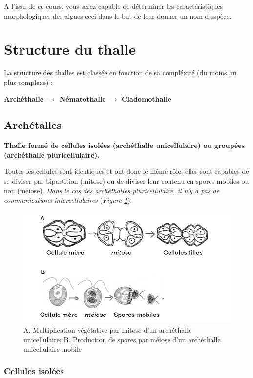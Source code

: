 \documentclass[
]{book}
\begin{document}
A l'issu de ce cours, vous serez capable de déterminer les caractéristiques morphologiques des algues ceci dans le but de leur donner un nom d'espèce.

\hypertarget{structure-du-thalle}{%
\section{Structure du thalle}\label{structure-du-thalle}}

La structure des thalles est classée en fonction de sa compléxité (du moins au plus complexe) :

\textbf{Archéthalle \(\rightarrow\) Nématothalle \(\rightarrow\) Cladomothalle}

\hypertarget{archuxe9talles}{%
\subsection{Archétalles}\label{archuxe9talles}}

\textbf{Thalle formé de cellules isolées (archéthalle unicellulaire) ou groupées (archéthalle pluricellulaire).}

Toutes les cellules sont identiques et ont donc le même rôle, elles sont capables de se diviser par bipartition (mitose) ou de diviser leur contenu en spores mobiles ou non (méiose). \emph{Dans le cas des archéthalles pluricellulaire, il n'y a pas de communications intercellulaires} (\emph{Figure \ref{fig:archetallediv}}).

\begin{figure}[H]

{\centering \includegraphics[width=0.7\linewidth]{./images/archetalle_div} 

}

\caption{A. Multiplication végétative par mitose d'un archéthalle unicellulaire; B. Production de spores par méiose d'un archéthalle unicellulaire mobile}\label{fig:archetallediv}
\end{figure}

\hypertarget{cellules-isoluxe9es}{%
\subsubsection{Cellules isolées}\label{cellules-isoluxe9es}}
\end{document}
